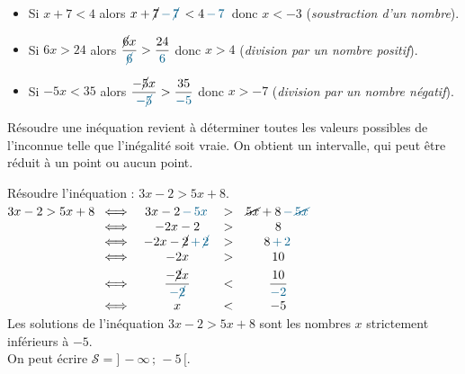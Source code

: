 \begin{exemple*1}
   \begin{itemize}
      \item Si $x+7 < 4$ alors $x+\cancel7 \textcolor{A1}{\,-\,\cancel7\,} < 4 \textcolor{A1}{\,-\,7\,}$ donc $x < -3$ \quad ({\it soustraction d'un nombre}). \rule[-5pt]{0pt}{5pt}
      \item Si $ 6x > 24$ alors $\dfrac{\cancel6x}{\textcolor{A1}{\cancel6}} > \dfrac{24}{\textcolor{A1}{6}}$ donc $x > 4$ \quad ({\it division par un nombre positif}). \rule[-10pt]{0pt}{10pt}
      \item Si $ -5x < 35$ alors $\dfrac{-\cancel5x}{\textcolor{A1}{-\cancel5}} > \dfrac{35}{\textcolor{A1}{-5}}$ donc $x > -7$ \quad ({\it division par un nombre négatif}). \\ [-6mm]
   \end{itemize}
\end{exemple*1}

\medskip

Résoudre une inéquation revient à déterminer toutes les valeurs possibles de l'inconnue telle que l'inégalité soit vraie. On obtient un intervalle, qui peut être réduit à un point ou aucun point.

\begin{exemple*1}
  Résoudre l'inéquation : $3x - 2 > 5x + 8$. \\
   $3x - 2 > 5x + 8
   \begin{array}[t]{lccc}      
      \iff & 3x - 2 \textcolor{A1}{\,-\,5x\,} & > & \cancel{5x} + 8 \textcolor{A1}{\,-\,\cancel{5x}\,} \\
      \iff & -2x - 2 & > & 8 \\
      \iff & -2x - \cancel2 \textcolor{A1}{\,+\,\cancel2\,} & > & 8 \textcolor{A1}{\,+\,2\,} \\
      \iff & -2x & > & 10 \\ [1mm]
      \iff & \dfrac{-\cancel2x}{\textcolor{A1}{-\cancel2}} & < & \dfrac{10}{\textcolor{A1}{-2}} \\ [2mm]
      \iff & x & < & -5 \\
   \end{array}$ \\ [2mm]
   Les solutions de l'inéquation $3x - 2 > 5x + 8$ sont les nombres $x$ strictement inférieurs à $-5$. \\
   On peut écrire $\mathcal{S} =]\,-\infty\,;\,-5\,[$.
\end{exemple*1}
 

\activites

